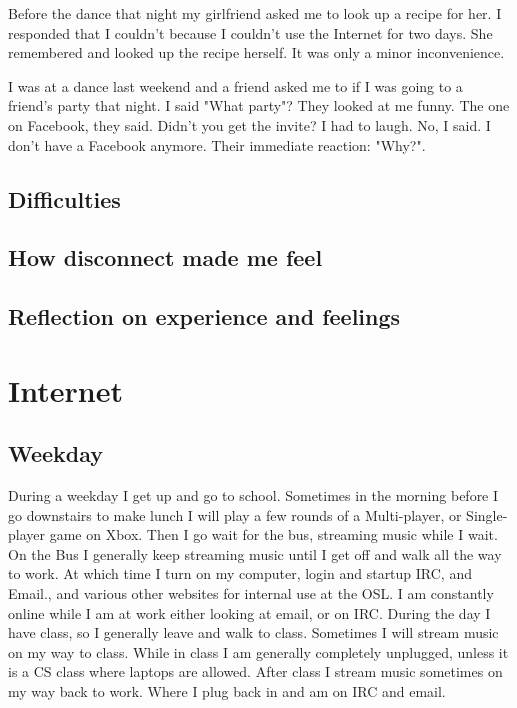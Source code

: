 \documentclass[12pt,letterpaper]{article}
\begin{document}
Before the dance that night my girlfriend asked me to look up a recipe
for her. I responded that I couldn't because I couldn't use the Internet
for two days. She remembered and looked up the recipe herself. It was
only a minor inconvenience.


I was at a dance last weekend and a friend asked me to if I was
going to a friend's party that night. I said "What party"? They looked
at me funny. The one on Facebook, they said. Didn't you get the invite?
I had to laugh. No, I said. I don't have a Facebook anymore. Their
immediate reaction: "Why?".





\subsection{Difficulties}
\subsection{How disconnect made me feel}
\subsection{Reflection on experience and feelings}


\section{Internet}
\subsection{Weekday}
During a weekday I get up and go to school. Sometimes in the morning
before I go downstairs to make lunch I will play a few rounds of a
Multi-player, or Single-player game on Xbox. Then I go wait for the bus,
streaming music while I wait. On the Bus I generally keep streaming
music until I get off and walk all the way to work. At which time I
turn on my computer, login and startup IRC, and Email., and various
other websites for internal use at the OSL. I am constantly online while
I am at work either looking at email, or on IRC. During the day I have
class, so I generally leave and walk to class. Sometimes I will stream
music on my way to class. While in class I am generally completely
unplugged, unless it is a CS class where laptops are allowed.  After
class I stream music sometimes on my way back to work.  Where I plug
back in and am on IRC and email.
\end{document}
